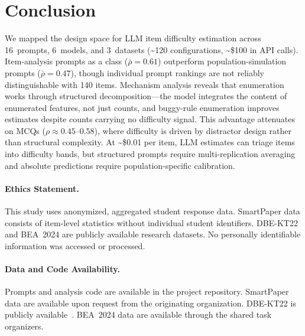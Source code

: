 \documentclass[runningheads]{llncs}
\begin{document}
\section{Conclusion}

We mapped the design space for LLM item difficulty estimation across 16~prompts, 6~models, and 3~datasets (\textasciitilde120 configurations, \textasciitilde\$100 in API calls). Item-analysis prompts as a class ($\bar{\rho}=0.61$) outperform population-simulation prompts ($\bar{\rho}=0.47$), though individual prompt rankings are not reliably distinguishable with 140 items. Mechanism analysis reveals that enumeration works through structured decomposition---the model integrates the content of enumerated features, not just counts, and buggy-rule enumeration improves estimates despite counts carrying no difficulty signal. This advantage attenuates on MCQs ($\rho\approx0.45$--$0.58$), where difficulty is driven by distractor design rather than structural complexity. At \textasciitilde\$0.01 per item, LLM estimates can triage items into difficulty bands, but structured prompts require multi-replication averaging and absolute predictions require population-specific calibration.

\paragraph{Ethics Statement.}
This study uses anonymized, aggregated student response data. SmartPaper data consists of item-level statistics without individual student identifiers. DBE-KT22 and BEA~2024 are publicly available research datasets. No personally identifiable information was accessed or processed.

\paragraph{Data and Code Availability.}
Prompts and analysis code are available in the project repository. SmartPaper data are available upon request from the originating organization. DBE-KT22 is publicly available~\cite{dbe-kt22-zenodo}. BEA~2024 data are available through the shared task organizers.
\end{document}
